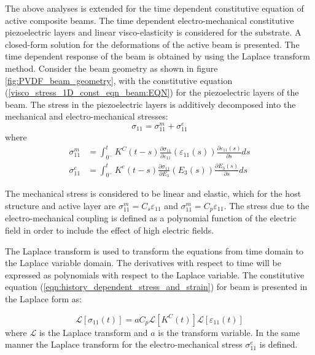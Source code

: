 The above analyses is extended for the time dependent constitutive equation of active composite beams.
The time dependent electro-mechanical constitutive piezoelectric layers and linear visco-elasticity is considered for the substrate.
A closed-form solution for the deformations of the active beam is presented.
The time dependent response of the beam is obtained by using the Laplace transform method.
Consider the beam geometry as shown in figure \ref{fig:PVDF_beam_geometry},
 with the constitutive equation (\ref{visco_stress_1D_const_eqn_beam:EQN}) for the piezoelectric layers of the beam.
The stress in the piezoelectric layers is additively decomposed into the mechanical and electro-mechanical stresses:
\begin{equation}
\sigma_{11}=\sigma_{11}^m+\sigma_{11}^e
\end{equation}
where
\begin{equation}
\begin{aligned}
\sigma_{11}^m&=\int_{0^-}^t
K^C(t-s)\frac{\partial \sigma_{11}}{\partial\varepsilon_{11}} (\varepsilon_{11}(s))  \frac{\partial {\varepsilon}_{11}(s)}{\partial s}ds\\
\sigma_{11}^e&=\int_{0^-}^t
K^e (t-s) \frac{\partial \sigma_{11}}{\partial E_{3}}(E_3(s)) \frac{\partial {E}_{3} (s)}{\partial s} ds
\end{aligned}
\label{eqn:history_dependent_stress_and_strain}
\end{equation}

The mechanical stress is considered to be linear and elastic,
which for the host structure and active layer are $\sigma_{11}^m=C_s \varepsilon_{11}$ and $\sigma_{11}^m=C_p \varepsilon_{11}$.
The stress due to the electro-mechanical coupling is defined as a polynomial function of the electric field in order to include the effect of high electric fields.



The Laplace transform is used to transform the equations from time domain to the Laplace variable domain.
The derivatives with respect to time will be expressed as polynomials with respect to the Laplace variable.
The constitutive equation (\ref{eqn:history_dependent_stress_and_strain}) for beam is presented in the Laplace form as:

\begin{equation}
\mathcal{L} \left[ \sigma_{11}(t) \right]=a  C_p \mathcal{L} \left[ K^C(t) \right] \mathcal{L} \left[ \varepsilon_{11}(t) \right]
\end{equation}
where $\mathcal{L}$ is the Laplace transform and $a$ is the transform variable.
In the same manner the Laplace transform for the electro-mechanical stress $\sigma_{11}^e$ is defined.

